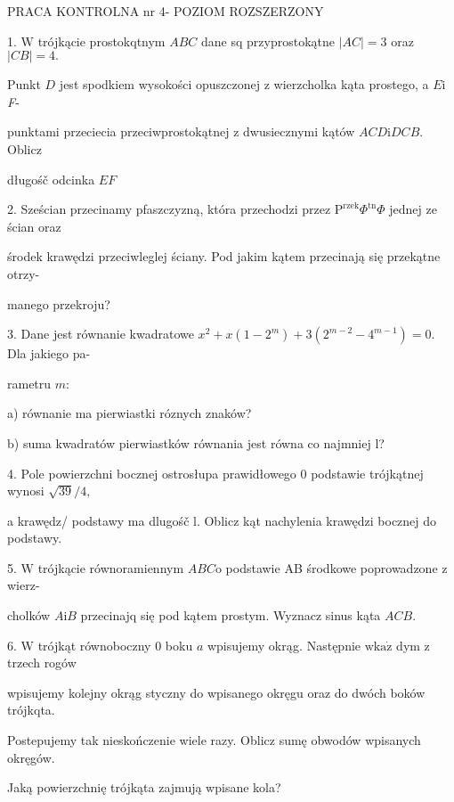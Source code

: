 \documentclass[a4paper,12pt]{article}
\begin{document}
PRACA KONTROLNA nr 4- POZIOM ROZSZERZONY

1. $\mathrm{W}$ trójkącie prostokqtnym $ABC$ dane sq przyprostokątne $|AC| = 3$ oraz $|CB| = 4.$

Punkt $D$ jest spodkiem wysokości opuszczonej $\mathrm{z}$ wierzcholka kąta prostego, a $E\mathrm{i}$ {\it F}-

punktami przeciecia przeciwprostokątnej $\mathrm{z}$ dwusiecznymi kątów $ACD \mathrm{i} DCB$. Oblicz

długośč odcinka $EF$

2. Sześcian przecinamy pfaszczyzną, która przechodzi przez $\mathrm{P}^{\mathrm{r}\mathrm{z}\mathrm{e}\mathrm{k}}\Phi^{\mathrm{t}\mathrm{n}}\Phi$ jednej ze ścian oraz

środek krawędzi przeciwleglej ściany. Pod jakim kątem przecinają się przekątne otrzy-

manego przekroju?

3. Dane jest równanie kwadratowe $x^{2}+x(1-2^{m})+3(2^{m-2}-4^{m-1})=0$. Dla jakiego pa-

rametru $m$:

a) równanie ma pierwiastki róznych znaków?

b) suma kwadratów pierwiastków równania jest równa co najmniej l?

4. Pole powierzchni bocznej ostrosłupa prawidłowego $0$ podstawie trójkątnej wynosi $\sqrt{39}/4,$

a krawędz/ podstawy ma dlugośč l. Oblicz kąt nachylenia krawędzi bocznej do podstawy.

5. $\mathrm{W}$ trójkącie równoramiennym $ABC\mathrm{o}$ podstawie AB środkowe poprowadzone $\mathrm{z}$ wierz-

cholków $A\mathrm{i}B$ przecinajq się pod kątem prostym. Wyznacz sinus kąta $ACB.$

6. $\mathrm{W}$ trójkąt równoboczny $0$ boku $a$ wpisujemy okrąg. Następnie $\mathrm{w}\mathrm{k}\mathrm{a}\dot{\mathrm{z}}$ dym $\mathrm{z}$ trzech rogów

wpisujemy kolejny okrąg styczny do wpisanego okręgu oraz do dwóch boków trójkqta.

Postepujemy tak nieskończenie wiele razy. Oblicz sumę obwodów wpisanych okręgów.

Jaką powierzchnię trójkąta zajmują wpisane kola?
\end{document}
